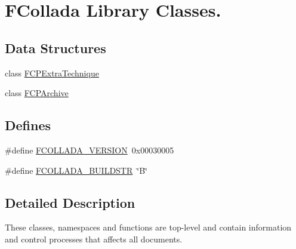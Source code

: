 \hypertarget{group__FCollada}{
\section{FCollada Library Classes.}
\label{group__FCollada}
}
\subsection*{Data Structures}
\begin{DoxyCompactItemize}
\item 
class \hyperlink{classFCPExtraTechnique}{FCPExtraTechnique}
\item 
class \hyperlink{classFCPArchive}{FCPArchive}
\end{DoxyCompactItemize}
\subsection*{Defines}
\begin{DoxyCompactItemize}
\item 
\#define \hyperlink{group__FCollada_ga8c605d8bc3b9e915e61fcfcf53754aac}{FCOLLADA\_\-VERSION}~0x00030005
\item 
\#define \hyperlink{group__FCollada_gae93ce255d6017777d3a5f89bcb8e5eab}{FCOLLADA\_\-BUILDSTR}~\char`\"{}B\char`\"{}
\end{DoxyCompactItemize}


\subsection{Detailed Description}
These classes, namespaces and functions are top-\/level and contain information and control processes that affects all documents. 

